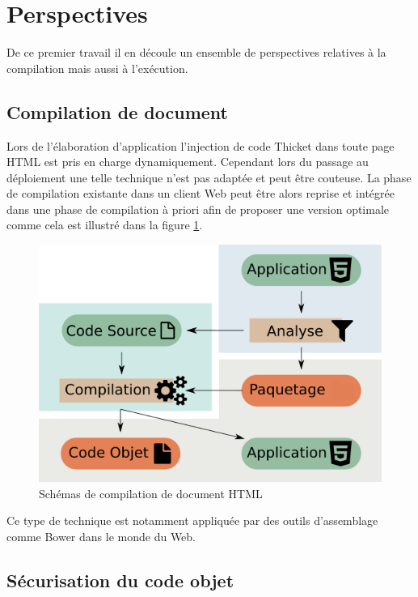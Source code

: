 \documentclass[twoside,a4paper]{article}
\begin{document}
\section{Perspectives}

De  ce premier  travail  il  en découle  un  ensemble de  perspectives
relatives à la compilation mais aussi à l'exécution.

\subsection{Compilation de document} 

Lors de  l'élaboration d'application l'injection de  code Thicket dans
toute page  HTML est pris  en charge dynamiquement. Cependant  lors du
passage au déploiement  une telle technique n'est pas  adaptée et peut
être couteuse.  La phase de  compilation existante dans un  client Web
peut être  alors reprise et intégrée  dans une phase de  compilation à
priori afin de  proposer une version optimale comme  cela est illustré
dans la figure \ref{precompile}.

\begin{figure}[h]
\centering
\includegraphics[scale=0.45]{precompile} 
\caption{Schémas de compilation de document HTML}
\label{precompile}
\end{figure}

Ce  type  de   technique  est  notamment  appliquée   par  des  outils
d'assemblage comme Bower \cite{bower} dans le monde du Web.

\subsection{Sécurisation du code objet}
\end{document}
